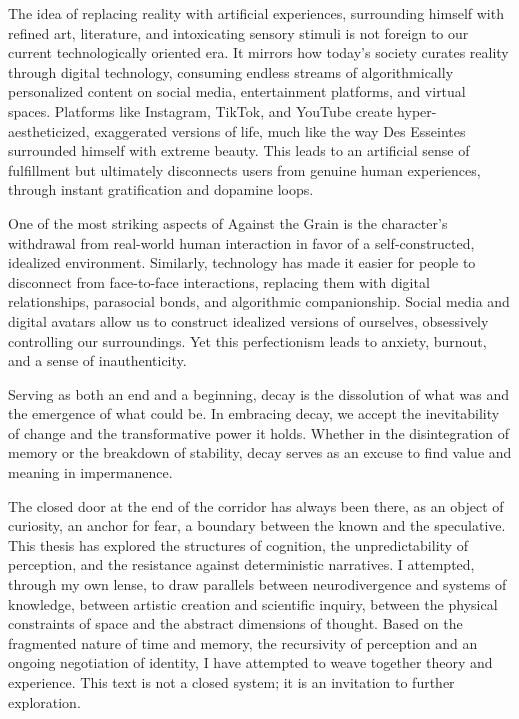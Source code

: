 The idea of replacing reality with artificial experiences, surrounding himself with refined art, literature, and intoxicating sensory stimuli is not foreign to our current technologically oriented era. It mirrors how today's society curates reality through digital technology, consuming endless streams of algorithmically personalized content on social media, entertainment platforms, and virtual spaces. Platforms like Instagram, TikTok, and YouTube create hyper-aestheticized, exaggerated versions of life, much like the way Des Esseintes surrounded himself with extreme beauty. This leads to an artificial sense of fulfillment but ultimately disconnects users from genuine human experiences, through instant gratification and dopamine loops.

One of the most striking aspects of Against the Grain is the character's withdrawal from real-world human interaction in favor of a self-constructed, idealized environment. Similarly, technology has made it easier for people to disconnect from face-to-face interactions, replacing them with digital relationships, parasocial bonds, and algorithmic companionship. Social media and digital avatars allow us to construct idealized versions of ourselves, obsessively controlling our surroundings. Yet this perfectionism leads to anxiety, burnout, and a sense of inauthenticity.

Serving as both an end and a beginning, decay is the dissolution of what was and the emergence of what could be. In embracing decay, we accept the inevitability of change and the transformative power it holds. Whether in the disintegration of memory or the breakdown of stability, decay serves as an excuse to find value and meaning in impermanence.



The closed door at the end of the corridor has always been there, as an object of curiosity, an anchor for fear, a boundary between the known and the speculative. This thesis has explored the structures of cognition, the unpredictability of perception, and the resistance against deterministic narratives. I attempted, through my own lense, to draw parallels between neurodivergence and systems of knowledge, between artistic creation and scientific inquiry, between the physical constraints of space and the abstract dimensions of thought. Based on the fragmented nature of time and memory, the recursivity of perception and an ongoing negotiation of identity, I have attempted to weave together theory and experience. This text is not a closed system; it is an invitation to further exploration. 